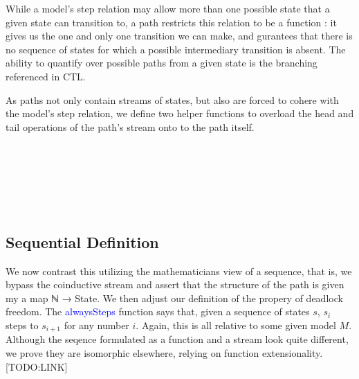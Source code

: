 \documentclass{article}
\newcommand{\blue}[1]{\textcolor{blue}{#1}}
\begin{document}
While a model's step relation may allow more than one possible state that a
given state can transition to, a path restricts this relation to be a function :
it gives us the one and only one transition we can make, and gurantees that
there is no sequence of states for which a possible intermediary transition is
absent. The ability to quantify over possible paths from a given state is the
branching referenced in CTL.

As paths not only contain streams of states, but also are forced to cohere with
the model's step relation, we define two helper functions to overload the head
and tail operations of the path's stream onto to the path itself.

\begin{code}%
%
\>[2]\AgdaSpace{}%
\AgdaSymbol{:}\AgdaSpace{}%
\AgdaSpace{}%
\AgdaSpace{}%
\<%
\\
%
\>[2]\AgdaSpace{}%
\AgdaSpace{}%
\AgdaSymbol{=}\AgdaSpace{}%
\AgdaSpace{}%
\AgdaSymbol{(}\AgdaSpace{}%
\AgdaSymbol{)}\<%
\\
%
\\[\AgdaEmptyExtraSkip]%
%
\>[2]\AgdaSpace{}%
\AgdaSymbol{:}\AgdaSpace{}%
\AgdaSpace{}%
\AgdaSpace{}%
\<%
\\
%
\>[2]\AgdaSpace{}%
\AgdaSpace{}%
%
\>[29]\AgdaSymbol{=}\AgdaSpace{}%
\AgdaSpace{}%
\AgdaSymbol{(}\AgdaSpace{}%
\AgdaSymbol{)}\<%
\\
%
\>[2]\AgdaSpace{}%
\AgdaSpace{}%
\AgdaSpace{}%
\AgdaSymbol{=}\AgdaSpace{}%
\AgdaSpace{}%
\AgdaSymbol{(}\AgdaSpace{}%
\AgdaSymbol{)}\<%
\end{code}


\subsection{Sequential Definition}

We now contrast this utilizing the mathematicians view of a sequence, that is,
we bypass the coinductive stream and assert that the structure of the path is
given my a map ℕ → State. We then adjust our definition of the propery of
deadlock freedom. The \blue{alwaysSteps} function says that, given a sequence of
states $s$, $s_i$ steps to $s_{i+1}$ for any number $i$. Again, this is all
relative to some given model $M$. Although the seqence formulated as a function
and a stream look quite different, we prove they are isomorphic elsewhere,
relying on function extensionality. [TODO:LINK]
\end{document}
